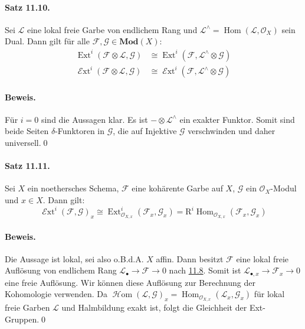 \paragraph{Satz 11.10.}\label{11.10} Sei $\mathcal{L}$ eine lokal freie Garbe von endlichem Rang und $\mathcal{L}^\wedge=\operatorname{Hom}(\mathcal{L},\mathcal{O}_X)$ sein Dual. Dann gilt für alle $\mathcal{F},\mathcal{G}\in\mathbf{Mod}(X)$:
\begin{align*}
\operatorname{Ext}^i(\mathcal{F}\otimes\mathcal{L},\mathcal{G}) &\cong \operatorname{Ext}^i(\mathcal{F},\mathcal{L}^\wedge\otimes\mathcal{G})\\
\operatorname{\mathcal{E}xt}^i(\mathcal{F}\otimes\mathcal{L},\mathcal{G}) &\cong \operatorname{\mathcal{E}xt}^i(\mathcal{F},\mathcal{L}^\wedge\otimes\mathcal{G})
\end{align*}

\paragraph{Beweis.} Für $i=0$ sind die Aussagen klar. Es ist $-\otimes\mathcal{L}^\wedge$ ein exakter Funktor. Somit sind beide Seiten $\delta$-Funktoren in $\mathcal{G}$, die auf Injektive $\mathcal{G}$ verschwinden und daher universell.\qed

\paragraph{Satz 11.11.}\label{11.11} Sei $X$ ein noethersches Schema, $\mathcal{F}$ eine kohärente Garbe auf $X$, $\mathcal{G}$ ein  $\mathcal{O}_X$-Modul und $x\in X$. Dann gilt:
\[\operatorname{\mathcal{E}xt}^i(\mathcal{F},\mathcal{G})_x\cong \operatorname{Ext}^i_{\mathcal{O}_{X,x}}(\mathcal{F}_x,\mathcal{G}_x) = \mathrm{R}^i\operatorname{Hom}_{\mathcal{O}_{X,x}}(\mathcal{F}_x,\mathcal{G}_x) \]

\paragraph{Beweis.} Die Aussage ist lokal, sei also o.B.d.A. $X$ affin. Dann besitzt $\mathcal{F}$ eine lokal freie Auflösung von endlichem Rang $\mathcal{L}_\bullet\to\mathcal{F}\to 0$ nach \hyperref[11.8]{11.8}. Somit ist $\mathcal{L}_{\bullet,x}\to\mathcal{F}_x\to 0$ eine freie Auflösung. Wir können diese Auflösung zur Berechnung der Kohomologie verwenden. Da $\operatorname{\mathcal{H}om}(\mathcal{L},\mathcal{G})_x=\operatorname{Hom}_{\mathcal{O}_{X,x}}(\mathcal{L}_x,\mathcal{G}_x)$ für lokal freie Garben $\mathcal{L}$ und Halmbildung exakt ist, folgt die Gleichheit der Ext-Gruppen.\qed

